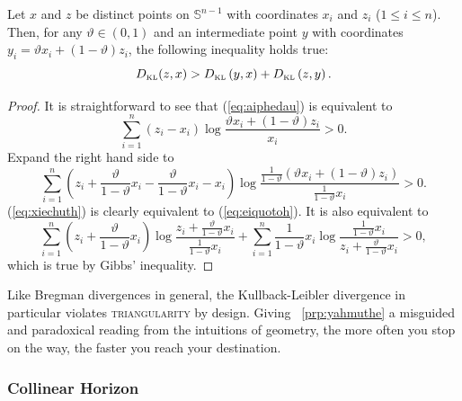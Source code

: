 \documentclass[12pt]{article}
\begin{document}
\begin{proposition}
      \label{prp:yahmuthe}
      Let $x$ and $z$ be distinct points on $\mathbb{S}^{n-1}$ with
      coordinates $x_{i}$ and $z_{i}$ ($1\leq{}i\leq{}n$).
      Then, for any $\vartheta\in{}(0,1)$ and an intermediate point
      $y$ with coordinates
      $y_{i}=\vartheta{}x_{i}+(1-\vartheta)z_{i}$, the following
      inequality holds true:
\begin{equation}
  \label{eq:aiphedau}
  D_{\mbox{\tiny KL}}(z,x)>D_{\mbox{\tiny KL}}\left(y,x\right)+D_{\mbox{\tiny KL}}\left(z,y\right).
\end{equation}
\end{proposition}

\begin{proof}
    \label{prf:othahtha}
It is straightforward to see that (\ref{eq:aiphedau}) is equivalent to
\begin{equation}
  \label{eq:eiquotoh}
  \sum_{i=1}^{n}(z_{i}-x_{i})\log\frac{\vartheta{}x_{i}+(1-\vartheta)z_{i}}{x_{i}}>0.
\end{equation}
Expand the right hand side to
\begin{equation}
  \label{eq:xiechuth}
  \sum_{i=1}^{n}\left(z_{i}+\frac{\vartheta}{1-\vartheta}x_{i}-\frac{\vartheta}{1-\vartheta}x_{i}-x_{i}\right)\log\frac{\frac{1}{1-\vartheta}\left(\vartheta{}x_{i}+(1-\vartheta)z_{i}\right)}{\frac{1}{1-\vartheta}x_{i}}>0.
\end{equation}
(\ref{eq:xiechuth}) is clearly equivalent to (\ref{eq:eiquotoh}). It
is also equivalent to
\begin{equation}
  \label{eq:ohrohshi}
  \sum_{i=1}^{n}\left(z_{i}+\frac{\vartheta}{1-\vartheta}x_{i}\right)\log\frac{z_{i}+\frac{\vartheta}{1-\vartheta}x_{i}}{\frac{1}{1-\vartheta}x_{i}}+
  \sum_{i=1}^{n}\frac{1}{1-\vartheta}x_{i}\log\frac{\frac{1}{1-\vartheta}x_{i}}{z_{i}+\frac{\vartheta}{1-\vartheta}x_{i}}>0,
\end{equation}
which is true by Gibbs' inequality.
\end{proof}

Like Bregman divergences in general, the Kullback-Leibler divergence
in particular violates \textsc{triangularity} by design. Giving
{\roposition}~\ref{prp:yahmuthe} a misguided and paradoxical reading from
the intuitions of geometry, the more often you stop on the way, the
faster you reach your destination.

\subsubsection{Collinear Horizon}
\label{subsubsec:colhor}
\end{document}
